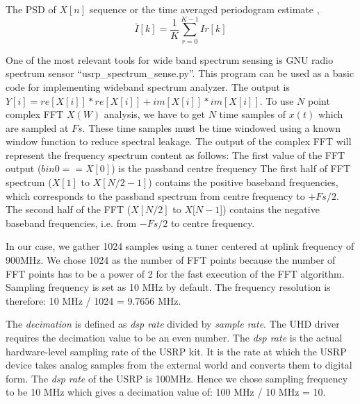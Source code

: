 The PSD of $X[n]$ sequence or the time averaged periodogram estimate ,
\begin{equation*}
\bar{I}[k] = \frac{1}{K}\sum_{r=0}^{K-1}Ir[k]
\end{equation*}

One of the most relevant tools for wide band spectrum sensing is GNU radio spectrum sensor \mbox{``usrp\_spectrum\_sense.py''.}
 This program can be used as a basic code for implementing wideband spectrum analyzer. The output is  $Y[i] = re[X[i]]*re[X[i]] + im[X[i]]*im[X[i]]$.
To use $N$ point complex FFT $X(W)$ analysis, we have to get $N$ time samples of $x(t)$  which are sampled at $Fs$. These time samples must be time windowed using a known window function to reduce spectral leakage. The output of the complex FFT will represent the frequency spectrum content as follows:
The first value of the FFT output ($bin 0 == X[0]$) is the passband centre frequency
The first half of FFT spectrum ($X[1]$ to $X[N/2-1]$) contains the positive baseband frequencies, which corresponds to the passband spectrum from centre frequency to $+Fs/2$.
The second half of the FFT ($X[N/2]$ to $X[N-1$]) contains the negative baseband frequencies, i.e. from $-Fs/2$ to centre frequency.

In our case, we  gather 1024 samples using a tuner centered at uplink frequency of 900MHz. We chose 1024 as the number of FFT points because the number of FFT points has to be a power of 2 for the fast execution of the FFT algorithm. Sampling frequency is set as 10 MHz by default. The frequency resolution is therefore: 10 MHz / 1024 = 9.7656 MHz.

The \emph{decimation} is defined as \emph{dsp rate} divided by \emph{sample rate}. The UHD driver requires the decimation value to be an even number. The \emph{dsp rate} is the actual hardware-level sampling rate of the USRP kit. It is the rate at which the USRP device takes analog samples from the external world and converts them to digital form.  The \emph{dsp rate} of the USRP is 100MHz. Hence we chose sampling frequency to be 10 MHz which gives a decimation value of: 100 MHz / 10 MHz = 10.


